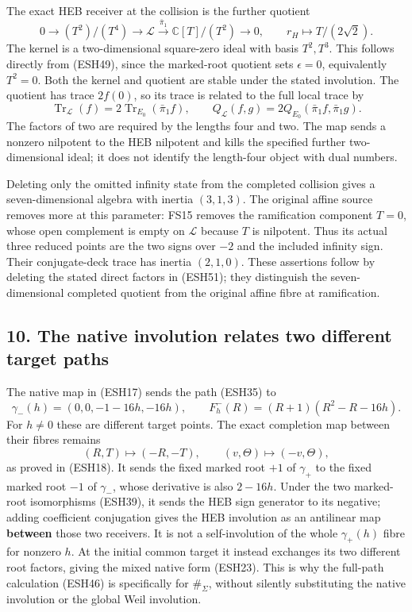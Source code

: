 \documentclass[
  10pt,
  a4paper,
]{article}
\begin{document}
The exact HEB receiver at the collision is the further quotient \[
0\longrightarrow(T^2)/(T^4)
\longrightarrow\mathcal L
\xrightarrow{\ \bar\pi_1\ }\mathbb C[T]/(T^2)
\longrightarrow0,
\qquad r_H\longmapsto T/(2\sqrt2).
\tag{ESH54}
\] The kernel is a two-dimensional square-zero ideal with basis
\(T^2,T^3\). This follows directly from (ESH49), since the marked-root
quotient sets \(\epsilon=0\), equivalently \(T^2=0\). Both the kernel
and quotient are stable under the stated involution. The quotient has
trace \(2f(0)\), so its trace is related to the full local trace by \[
\operatorname{Tr}_{\mathcal L}(f)
=2\operatorname{Tr}_{E_0}(\bar\pi_1 f),\qquad
Q_{\mathcal L}(f,g)
=2Q_{E_0}(\bar\pi_1f,\bar\pi_1g).
\tag{ESH55}
\] The factors of two are required by the lengths four and two. The map
sends a nonzero nilpotent to the HEB nilpotent and kills the specified
further two-dimensional ideal; it does not identify the length-four
object with dual numbers.

Deleting only the omitted infinity state from the completed collision
gives a seven-dimensional algebra with inertia \((3,1,3)\). The original
affine source removes more at this parameter: FS15 removes the
ramification component \(T=0\), whose open complement is empty on
\(\mathcal L\) because \(T\) is nilpotent. Thus its actual three reduced
points are the two signs over \(-2\) and the included infinity sign.
Their conjugate-deck trace has inertia \((2,1,0)\). These assertions
follow by deleting the stated direct factors in (ESH51); they
distinguish the seven-dimensional completed quotient from the original
affine fibre at ramification.

\subsection{10. The native involution relates two different target
paths}\label{the-native-involution-relates-two-different-target-paths}

The native map in (ESH17) sends the path (ESH35) to \[
\gamma_-(h)=(0,0,-1-16h,-16h),\qquad
F^-_h(R)=(R+1)(R^2-R-16h).
\tag{ESH56}
\] For \(h\ne0\) these are different target points. The exact completion
map between their fibres remains \[
(R,T)\longmapsto(-R,-T),\qquad
(v,\Theta)\longmapsto(-v,\Theta),
\tag{ESH57}
\] as proved in (ESH18). It sends the fixed marked root \(+1\) of
\(\gamma_+\) to the fixed marked root \(-1\) of \(\gamma_-\), whose
derivative is also \(2-16h\). Under the two marked-root isomorphisms
(ESH39), it sends the HEB sign generator to its negative; adding
coefficient conjugation gives the HEB involution as an antilinear map
\textbf{between} those two receivers. It is not a self-involution of the
whole \(\gamma_+(h)\) fibre for nonzero \(h\). At the initial common
target it instead exchanges its two different root factors, giving the
mixed native form (ESH23). This is why the full-path calculation (ESH46)
is specifically for \(\#_\Sigma\), without silently substituting the
native involution or the global Weil involution.
\end{document}
